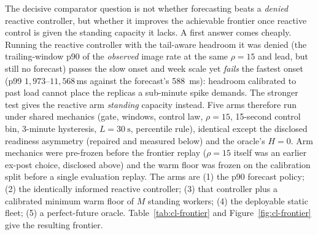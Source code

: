 The decisive comparator question is not whether forecasting beats a
\emph{denied} reactive controller, but whether it improves the achievable
frontier once reactive control is given the standing capacity it lacks. A first
answer comes cheaply. Running the reactive controller with the tail-aware
headroom it was denied (the trailing-window p90 of the \emph{observed} image
rate at the same $\rho{=}15$ and lead, but still no forecast) passes the
slow onset and week scale yet \emph{fails} the fastest onset (p99
$1{,}973$--$11{,}568$\,\si{\milli\second} against the forecast's
\SI{588}{\milli\second}): headroom calibrated to past load cannot place the
replicas a sub-minute spike demands. The stronger test gives the reactive arm
\emph{standing} capacity instead. Five arms therefore run under shared
mechanics (gate, windows, control law, $\rho{=}15$, 15-second control
bin, 3-minute hysteresis, $L{=}\SI{30}{\second}$, percentile rule),
identical except the disclosed readiness asymmetry
(repaired and measured below) and the oracle's $H{=}0$. Arm mechanics were
pre-frozen before the frontier replay ($\rho{=}15$ itself was an earlier
ex-post choice, disclosed above) and the warm floor was frozen on the
calibration split before a single evaluation replay. The arms are (1) the p90
forecast policy; (2) the identically
informed reactive controller; (3) that controller plus a calibrated minimum
warm floor of $M$ standing workers; (4) the deployable static fleet; (5) a
perfect-future oracle. Table~\ref{tab:cl-frontier} and
Figure~\ref{fig:cl-frontier} give the resulting frontier.


